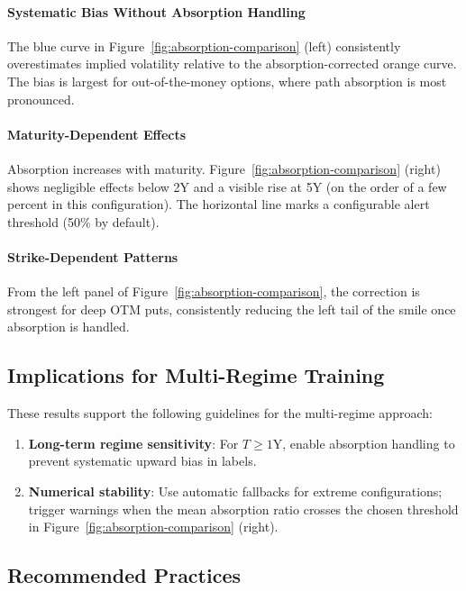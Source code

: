 	\paragraph{Systematic Bias Without Absorption Handling}
	The blue curve in Figure~\ref{fig:absorption-comparison} (left) consistently overestimates implied volatility relative to the absorption-corrected orange curve. The bias is largest for out-of-the-money options, where path absorption is most pronounced.
	
	\paragraph{Maturity-Dependent Effects}
	Absorption increases with maturity. Figure~\ref{fig:absorption-comparison} (right) shows negligible
	effects below 2Y and a visible rise at 5Y (on the order of a few percent in this configuration).
	The horizontal line marks a configurable alert threshold (50\% by default).
	
	\paragraph{Strike-Dependent Patterns}
	From the left panel of Figure~\ref{fig:absorption-comparison}, the correction is strongest for deep OTM puts, consistently reducing the left tail of the smile once absorption is handled.
	
	\subsection{Implications for Multi-Regime Training}
	
	These results support the following guidelines for the multi-regime approach:
	\begin{enumerate}[leftmargin=*]
		\item \textbf{Long-term regime sensitivity}: For $T \ge 1$Y, enable absorption handling to prevent systematic upward bias in labels.
		\item \textbf{Numerical stability}: Use automatic fallbacks for extreme configurations; trigger warnings when the mean absorption ratio crosses the chosen threshold in Figure~\ref{fig:absorption-comparison} (right).
	\end{enumerate}
	
	\subsection{Recommended Practices}
	
